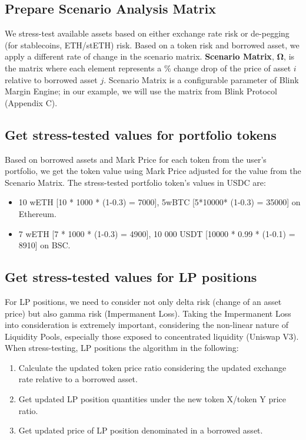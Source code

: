 \documentclass[conference]{IEEEtran}
\begin{document}
\subsection{Prepare Scenario Analysis Matrix}
We stress-test available assets based on either exchange rate risk or de-pegging (for stablecoins, ETH/stETH) risk. Based on a token risk and borrowed asset, we apply a different rate of change in the scenario matrix. \textbf{Scenario Matrix}, $\boldsymbol{\Omega}$, is the matrix where each element represents a $\%$ change drop of the price of asset $i$ relative to borrowed asset $j$. Scenario Matrix is a configurable parameter of Blink Margin Engine; in our example, we will use the matrix from Blink Protocol (Appendix C).



\subsection{Get stress-tested values for portfolio tokens}
Based on borrowed assets and Mark Price for each token from the user’s portfolio, we get the token value using Mark Price adjusted for the value from the Scenario Matrix. The stress-tested portfolio token’s values in USDC are:
\begin{itemize}
	\item 10 wETH [10 * 1000 * (1-0.3) = 7000], 5wBTC [5*10000* (1-0.3) = 35000] on Ethereum.
	\item 7 wETH [7 * 1000 * (1-0.3) = 4900], 10 000 USDT [10000 * 0.99 * (1-0.1) = 8910] on BSC.
\end{itemize}


\subsection{Get stress-tested values for LP positions}
For LP positions, we need to consider not only delta risk (change of an asset price) but also gamma risk (Impermanent Loss). Taking the Impermanent Loss into consideration is extremely important, considering the non-linear nature of Liquidity Pools, especially those exposed to concentrated liquidity (Uniswap V3). When stress-testing, LP positions the algorithm in the following: 
\begin{enumerate}
	\item Calculate the updated token price ratio considering the updated exchange rate relative to a borrowed asset. 
	\item Get updated LP position quantities under the new token X/token Y price ratio.
	\item Get updated price of LP position denominated in a borrowed asset.
\end{enumerate}
\end{document}
